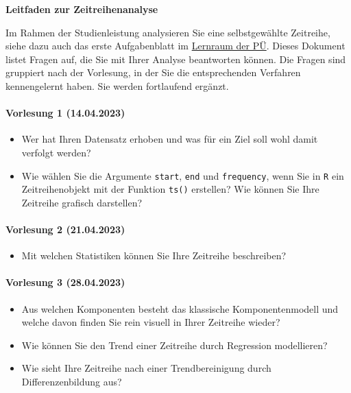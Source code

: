 \begin{center}
    \Large\sffamily
    \textbf{Leitfaden zur Zeitreihenanalyse}
\end{center}

Im Rahmen der Studienleistung analysieren Sie eine selbstgewählte Zeitreihe, siehe dazu auch das erste Aufgabenblatt im \href{https://moodle.uni-bielefeld.de/course/view.php?id=1035}{Lernraum der PÜ}. Dieses Dokument listet Fragen auf, die Sie mit Ihrer Analyse beantworten können. Die Fragen sind gruppiert nach der Vorlesung, in der Sie die entsprechenden Verfahren kennengelernt haben. Sie werden fortlaufend ergänzt.

\paragraph{Vorlesung 1 (14.04.2023)}
\begin{itemize}
    \item Wer hat Ihren Datensatz erhoben und was für ein Ziel soll wohl damit verfolgt werden?
    \item Wie wählen Sie die Argumente \texttt{start}, \texttt{end} und \texttt{frequency}, wenn Sie in \texttt{R} ein Zeitreihenobjekt mit der Funktion \texttt{ts()} erstellen? Wie können Sie Ihre Zeitreihe grafisch darstellen?
\end{itemize}

\paragraph{Vorlesung 2 (21.04.2023)}
\begin{itemize}
    \item Mit welchen Statistiken können Sie Ihre Zeitreihe beschreiben?
\end{itemize}

\paragraph{Vorlesung 3 (28.04.2023)}
\begin{itemize}
    \item Aus welchen Komponenten besteht das klassische Komponentenmodell und welche davon finden Sie rein visuell in Ihrer Zeitreihe wieder?
    \item Wie können Sie den Trend einer Zeitreihe durch Regression modellieren? 
    \item Wie sieht Ihre Zeitreihe nach einer Trendbereinigung durch Differenzenbildung aus?
\end{itemize}

